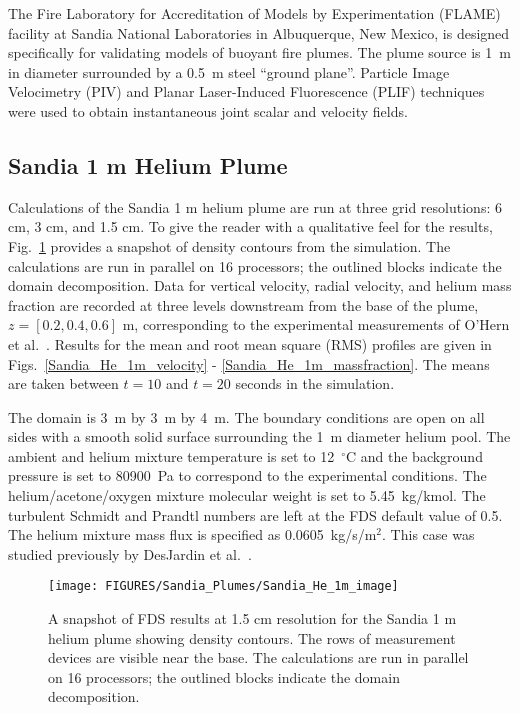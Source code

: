 The Fire Laboratory for Accreditation of Models by Experimentation (FLAME) facility \cite{OHern:2005,Blanchat:2001} at Sandia National Laboratories in Albuquerque, New Mexico, is designed specifically for validating models of buoyant fire plumes.  The plume source is 1~m in diameter surrounded by a 0.5~m steel ``ground plane''. Particle Image Velocimetry (PIV) and Planar Laser-Induced Fluorescence (PLIF) techniques were used to obtain instantaneous joint scalar and velocity fields.

\subsection{Sandia 1 m Helium Plume}
\label{Sandia plume}

Calculations of the Sandia 1 m helium plume are run at three grid resolutions: 6 cm, 3 cm, and 1.5 cm.  To give the reader with a qualitative feel for the results, Fig.~\ref{Sandia_He_1m_image} provides a snapshot of density contours from the simulation. The calculations are run in parallel on 16 processors; the outlined blocks indicate the domain decomposition.  Data for vertical velocity, radial velocity, and helium mass fraction are recorded at three levels downstream from the base of the plume, $z = [0.2, 0.4, 0.6]$ m, corresponding to the experimental measurements of O'Hern et al.~\cite{OHern:2005}.  Results for the mean and root mean square (RMS) profiles are given in Figs.~\ref{Sandia_He_1m_velocity} - \ref{Sandia_He_1m_massfraction}.  The means are taken between $t=10$ and $t=20$ seconds in the simulation.

The domain is 3~m by 3~m by 4~m. The boundary conditions are open on all sides with a smooth solid surface surrounding the 1~m diameter helium pool.  The ambient and helium mixture temperature is set to 12~$^\circ$C and the background pressure is set to 80900~Pa to correspond to the experimental conditions.  The helium/acetone/oxygen mixture molecular weight is set to 5.45~kg/kmol.  The turbulent Schmidt and Prandtl numbers are left at the FDS default value of 0.5.  The helium mixture mass flux is specified as 0.0605~kg/s/m$^2$. This case was studied previously by DesJardin et al.~\cite{DesJardin:2004}.
\begin{figure}[h]
\begin{center}
\texttt{[image: FIGURES/Sandia\_Plumes/Sandia\_He\_1m\_image]}
\caption[Sandia 1~m helium plume image]{A snapshot of FDS results at 1.5 cm resolution for the Sandia 1 m helium plume showing density contours.  The rows of measurement devices are visible near the base. The calculations are run in parallel on 16 processors; the outlined blocks indicate the domain decomposition.}
\label{Sandia_He_1m_image}
\end{center}
\end{figure}

